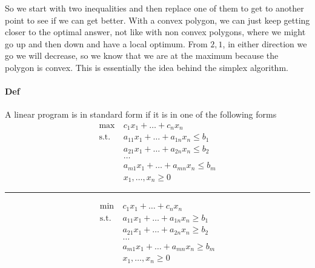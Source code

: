 \documentclass[12 pt]{article}
\begin{document}
        So we start with two inequalities and then replace one of them
        to get to another point to see if we can get better. With a
        convex polygon, we can just keep getting closer to the optimal
        answer, not like with non convex polygons, where we might go
        up and then down and have a local optimum. From $2,1$, in
        either direction we go we will decrease, so we know that we
        are at the maximum because the polygon is convex. This is
        essentially the idea behind the simplex algorithm.
        
        \paragraph{Def} A linear program is in standard form if it is
        in one of the following forms
        \begin{align*}
          \max \ & c_1x_1 + \ldots + c_n x_n
          \\ \text{s.t.} \ & a_{11}x_1 + \ldots + a_{1n}x_n \leq b_1
          \\ & a_{21}x_1 + \ldots + a_{2n}x_n \leq b_2
          \\ & \ldots
          \\ & a_{m1}x_1 + \ldots + a_{mn}x_n \leq b_m
          \\ & x_1, \ldots, x_n \geq 0
        \end{align*}
        \noindent \rule{\textwidth}{0.5pt}
        \begin{align*}
          \min \ & c_1x_1 + \ldots + c_n x_n
          \\ \text{s.t.} \ & a_{11}x_1 + \ldots + a_{1n}x_n \geq b_1
          \\ & a_{21}x_1 + \ldots + a_{2n}x_n \geq b_2
          \\ & \ldots
          \\ & a_{m1}x_1 + \ldots + a_{mn}x_n \geq b_m
          \\ & x_1, \ldots, x_n \geq 0
        \end{align*}
\end{document}
